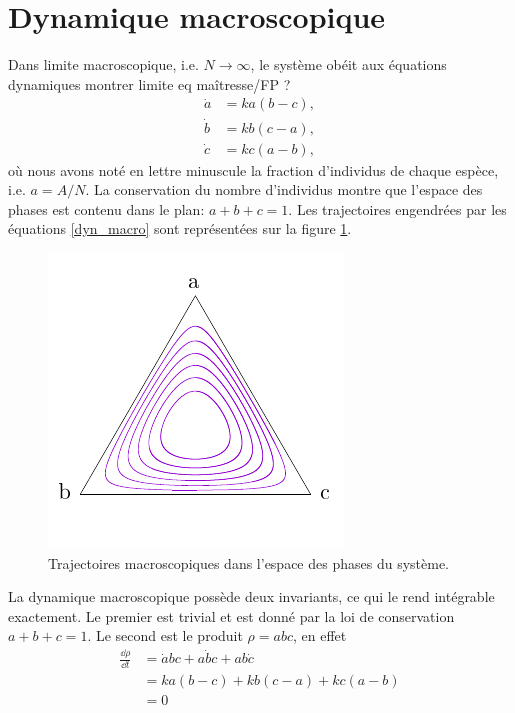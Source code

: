 \documentclass[openany,a4paper,12pt]{article}
\begin{document}
\section{Dynamique macroscopique}

\par Dans limite macroscopique, i.e. $N\rightarrow \infty$, le système obéit aux équations dynamiques {\color{red}montrer limite eq maîtresse/FP ?}
%
\begin{equation}\label{dyn_macro}
\begin{split}
	\dot a &= ka(b-c), \\
	\dot b &= kb(c-a), \\
	\dot c &= kc(a-b),
\end{split}
\end{equation}
%
où nous avons noté en lettre minuscule la fraction d'individus de chaque espèce, i.e. $a=A/N$. La conservation du nombre d'individus montre que l'espace des phases est contenu dans le plan: $a+b+c=1$. Les trajectoires engendrées par les équations \ref{dyn_macro} sont représentées sur la figure \ref{fig:portrait}.


\begin{figure}
	\centering
	\includegraphics[width=0.7\linewidth]{figures/portrait}
	\caption{Trajectoires macroscopiques dans l'espace des phases du système.}
	\label{fig:portrait}
\end{figure}



\par La dynamique macroscopique possède deux invariants, ce qui le rend intégrable exactement. Le premier est trivial et est donné par la loi de conservation $a+b+c=1$. Le second est le produit $\rho = abc$, en effet
%
\begin{equation}\label{rho_invariant}
\begin{split}
	\frac{\dd \rho}{\dd t} 
	&= \dot a bc + a \dot b c + ab \dot c \\
	&= ka(b-c) + kb(c-a) + kc(a-b) \\
	&= 0
\end{split}
\end{equation}
%
\end{document}
